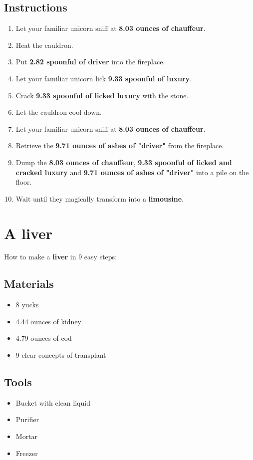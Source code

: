 \documentclass{article}
\begin{document}
\subsection{Instructions}\begin{enumerate}
\item 
Let your familiar unicorn sniff at \textbf{8.03 ounces of chauffeur}.
\item 
Heat the cauldron.
\item 
Put \textbf{2.82 spoonful of driver} into the fireplace.
\item 
Let your familiar unicorn lick \textbf{9.33 spoonful of luxury}.
\item 
Crack \textbf{9.33 spoonful of licked luxury} with the stone.
\item 
Let the cauldron cool down.
\item 
Let your familiar unicorn sniff at \textbf{8.03 ounces of chauffeur}.
\item 
Retrieve the \textbf{9.71 ounces of ashes of "driver"} from the fireplace.
\item 
Dump the \textbf{8.03 ounces of chauffeur}, \textbf{9.33 spoonful of licked and cracked luxury} and \textbf{9.71 ounces of ashes of "driver"} into a pile on the floor.
\item 
Wait until they magically transform into a \textbf{limousine}.
\end{enumerate}
\newpage
\section{A liver}How to make a \textbf{liver} in 9 easy steps:

\subsection{Materials}\begin{itemize}
\item 
8 yucks
\item 
4.44 ounces of kidney
\item 
4.79 ounces of cod
\item 
9 clear concepts of transplant
\end{itemize}
\subsection{Tools}\begin{itemize}
\item 
Bucket with clean liquid
\item 
Purifier
\item 
Mortar
\item 
Freezer
\end{itemize}
\end{document}
